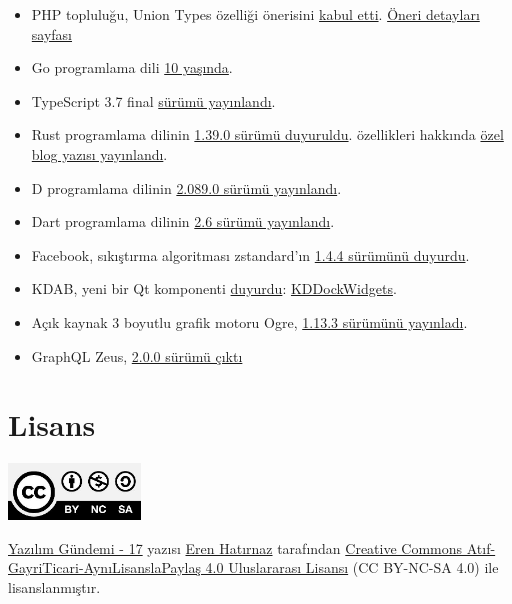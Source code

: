 \documentclass[11pt]{article}
\begin{document}
\begin{itemize}
\item PHP topluluğu, Union Types özelliği önerisini \href{https://github.com/php/php-rfcs/pull/1\#issuecomment-551454495}{kabul etti}. \href{https://wiki.php.net/rfc/union\_types\_v2}{Öneri detayları
sayfası}
\item Go programlama dili \href{https://blog.golang.org/10years}{10 yaşında}.
\item TypeScript 3.7 final \href{https://devblogs.microsoft.com/typescript/announcing-typescript-3-7/}{sürümü yayınlandı}.
\item Rust programlama dilinin \href{https://blog.rust-lang.org/2019/11/07/Rust-1.39.0.html}{1.39.0 sürümü duyuruldu}.
özellikleri hakkında \href{https://blog.rust-lang.org/2019/11/07/Async-await-stable.html}{özel blog yazısı yayınlandı}.
\item D programlama dilinin \href{https://dlang.org/blog/2019/11/06/dmd-2-089-0-released/}{2.089.0 sürümü yayınlandı}.
\item Dart programlama dilinin \href{https://medium.com/dartlang/dart2native-a76c815e6baf}{2.6 sürümü yayınlandı}.
\item Facebook, sıkıştırma algoritması zstandard'ın \href{https://github.com/facebook/zstd/releases/tag/v1.4.4}{1.4.4 sürümünü duyurdu}.
\item KDAB, yeni bir Qt komponenti \href{https://www.kdab.com/kddockwidgets/}{duyurdu}: \href{https://github.com/KDAB/KDDockWidgets}{KDDockWidgets}.
\item Açık kaynak 3 boyutlu grafik motoru Ogre, \href{https://www.ogre3d.org/2019/11/05/ogre-1-12-3-released}{1.13.3 sürümünü yayınladı}.
\item GraphQL Zeus, \href{https://github.com/graphql-editor/graphql-zeus/releases/tag/2.0.0}{2.0.0 sürümü çıktı}
\end{itemize}
\section{Lisans}
\label{sec:org866189e}
\begin{center}
\begin{center}
\includegraphics[height=1.5cm]{../../../img/CC_BY-NC-SA_4.0.png}
\end{center}

\href{yazilim-gundemi-17.pdf}{Yazılım Gündemi - 17} yazısı \href{https://erenhatirnaz.github.io}{Eren Hatırnaz} tarafından \href{http://creativecommons.org/licenses/by-nc-sa/4.0/}{Creative Commons
Atıf-GayriTicari-AynıLisanslaPaylaş 4.0 Uluslararası Lisansı} (CC BY-NC-SA 4.0)
ile lisanslanmıştır.
\end{center}
\end{document}
